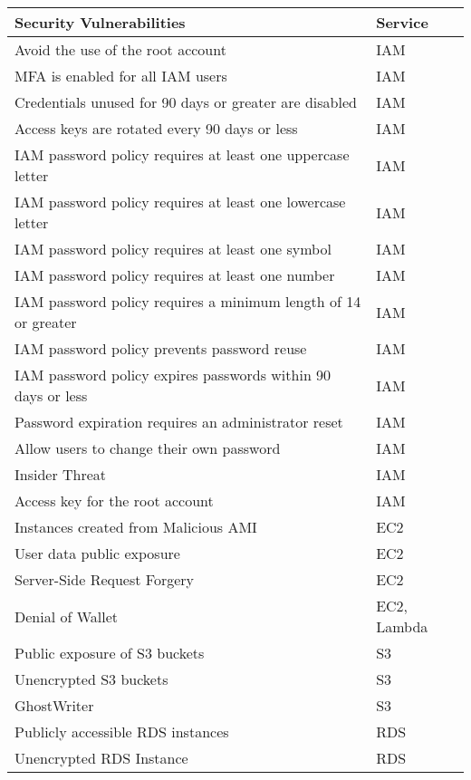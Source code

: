 \begin{longtable}{|p{12cm}|p{2.4cm}|}
    \hline
    \textbf{Security Vulnerabilities} & \textbf{Service} \\
    \hline
    Avoid the use of the root account & IAM \\
    \hline
    MFA is enabled for all IAM users & IAM  \\
    \hline
    Credentials unused for 90 days or greater are disabled & IAM  \\
    \hline
    Access keys are rotated every 90 days or less & IAM  \\
    \hline
    IAM password policy requires at least one uppercase letter & IAM  \\
    \hline
    IAM password policy requires at least one lowercase letter & IAM  \\
    \hline
    IAM password policy requires at least one symbol & IAM \\
    \hline
    IAM password policy requires at least one number & IAM \\
    \hline
    IAM password policy requires a minimum length of 14 or greater & IAM \\
    \hline
    IAM password policy prevents password reuse & IAM \\
    \hline
    IAM password policy expires passwords within 90 days or less & IAM \\
    \hline
    Password expiration requires an administrator reset & IAM \\
    \hline
    Allow users to change their own password & IAM \\
    \hline
    Insider Threat & IAM \\
    \hline
    Access key for the root account & IAM \\
    \hline
    Instances created from Malicious AMI & EC2 \\
    \hline
    User data public exposure & EC2 \\
    \hline
    Server-Side Request Forgery & EC2 \\
    \hline
    Denial of Wallet & EC2, Lambda \\
    \hline
    Public exposure of S3 buckets & S3 \\
    \hline
    Unencrypted S3 buckets & S3 \\
    \hline
    GhostWriter & S3  \\
    \hline
    Publicly accessible RDS instances & RDS \\
    \hline
    Unencrypted RDS Instance & RDS \\

\end{longtable}
